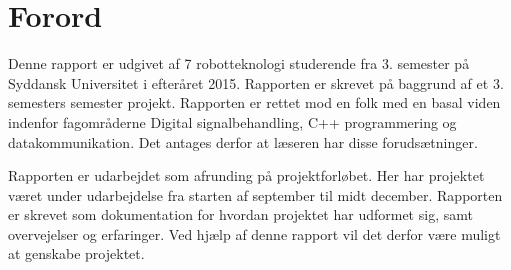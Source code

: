 \section*{Forord}
Denne rapport er udgivet af 7 robotteknologi studerende fra 3. semester på Syddansk Universitet i efteråret 2015. Rapporten er skrevet på baggrund af et 3. semesters semester projekt. 
Rapporten er rettet mod en folk med en basal viden indenfor fagområderne Digital signalbehandling, C++ programmering og datakommunikation. Det antages derfor at læseren har disse forudsætninger. 

Rapporten er udarbejdet som afrunding på projektforløbet. Her har projektet været under udarbejdelse fra starten af september til midt december. Rapporten er skrevet som dokumentation for hvordan projektet har udformet sig, samt overvejelser og erfaringer. Ved hjælp af denne rapport vil det derfor være muligt at genskabe projektet. 